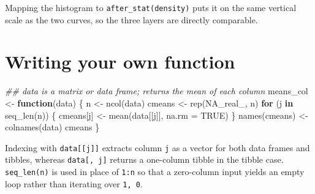 \documentclass[
  letterpaper,
  DIV=11,
  numbers=noendperiod]{scrreprt}
\newenvironment{Shaded}{\begin{snugshade}}{\end{snugshade}}
\newcommand{\AttributeTok}[1]{\textcolor[rgb]{0.40,0.45,0.13}{#1}}
\newcommand{\ConstantTok}[1]{\textcolor[rgb]{0.56,0.35,0.01}{#1}}
\newcommand{\ControlFlowTok}[1]{\textcolor[rgb]{0.00,0.23,0.31}{\textbf{#1}}}
\newcommand{\DocumentationTok}[1]{\textcolor[rgb]{0.37,0.37,0.37}{\textit{#1}}}
\newcommand{\FunctionTok}[1]{\textcolor[rgb]{0.28,0.35,0.67}{#1}}
\newcommand{\NormalTok}[1]{\textcolor[rgb]{0.00,0.23,0.31}{#1}}
\newcommand{\OtherTok}[1]{\textcolor[rgb]{0.00,0.23,0.31}{#1}}
\renewcommand{\[}{\begin{equation}}
\renewcommand{\]}{\end{equation}}
\begin{document}
Mapping the histogram to \texttt{after\_stat(density)} puts it on the
same vertical scale as the two curves, so the three layers are directly
comparable.

\section{Writing your own function}\label{writing-your-own-function}

\begin{Shaded}
\begin{Highlighting}[]
\DocumentationTok{\#\# data is a matrix or data frame; returns the mean of each column}
\NormalTok{means\_col }\OtherTok{\textless{}{-}} \ControlFlowTok{function}\NormalTok{(data) \{}
\NormalTok{  n }\OtherTok{\textless{}{-}} \FunctionTok{ncol}\NormalTok{(data)}
\NormalTok{  cmeans }\OtherTok{\textless{}{-}} \FunctionTok{rep}\NormalTok{(}\ConstantTok{NA\_real\_}\NormalTok{, n)}
  \ControlFlowTok{for}\NormalTok{ (j }\ControlFlowTok{in} \FunctionTok{seq\_len}\NormalTok{(n)) \{}
\NormalTok{    cmeans[j] }\OtherTok{\textless{}{-}} \FunctionTok{mean}\NormalTok{(data[[j]], }\AttributeTok{na.rm =} \ConstantTok{TRUE}\NormalTok{)}
\NormalTok{  \}}
  \FunctionTok{names}\NormalTok{(cmeans) }\OtherTok{\textless{}{-}} \FunctionTok{colnames}\NormalTok{(data)}
\NormalTok{  cmeans}
\NormalTok{\}}
\end{Highlighting}
\end{Shaded}

Indexing with \texttt{data{[}{[}j{]}{]}} extracts column \texttt{j} as a
vector for both data frames and tibbles, whereas \texttt{data{[},\ j{]}}
returns a one-column tibble in the tibble case. \texttt{seq\_len(n)} is
used in place of \texttt{1:n} so that a zero-column input yields an
empty loop rather than iterating over \texttt{1,\ 0}.
\end{document}
